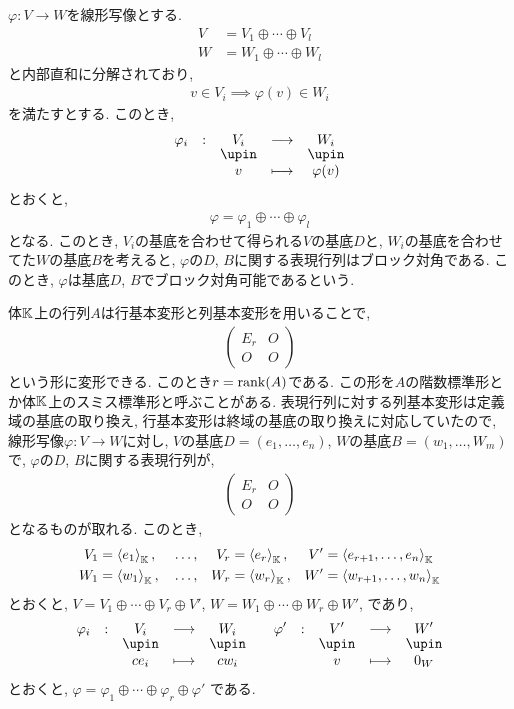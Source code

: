$\varphi\colon V\to W$を線形写像とする.
\begin{align*}
V&=V_1\oplus \cdots \oplus V_l\\
W&=W_1\oplus \cdots \oplus W_l
\end{align*}
と内部直和に分解されており,
\begin{align*}
v\in V_i\implies \varphi(v) \in W_i
\end{align*}
を満たすとする.
このとき,
\begin{align*}
\shazo{\varphi_i}{V_i}{W_i}
{v}{\varphi(v)}
\end{align*}
とおくと,
\begin{align*}
\varphi=\varphi_1\oplus\cdots\oplus \varphi_l
\end{align*}
となる.
このとき, $V_i$の基底を合わせて得られる$V$の基底$D$と,
$W_i$の基底を合わせてた$W$の基底$B$を考えると,
$\varphi$の$D$, $B$に関する表現行列はブロック対角である.
このとき, $\varphi$は基底$D$, $B$でブロック対角可能であるという.

体$\mathbb{K}$上の行列$A$は行基本変形と列基本変形を用いることで,
\begin{align*}
\begin{pmatrix}E_r&O\\O&O\end{pmatrix}
\end{align*}
という形に変形できる.
このとき$r=\operatorname{rank}(A)$である.
この形を$A$の階数標準形とか体$\mathbb{K}$上のスミス標準形と呼ぶことがある.
表現行列に対する列基本変形は定義域の基底の取り換え,
行基本変形は終域の基底の取り換えに対応していたので,
線形写像$\varphi\colon V\to W$に対し,
$V$の基底$D=(e_1,\ldots,e_n)$,
$W$の基底$B=(w_1,\ldots,W_m)$
で,
$\varphi$の$D$, $B$に関する表現行列が,
\begin{align*}
\begin{pmatrix}E_r&O\\O&O\end{pmatrix}
\end{align*}
となるものが取れる.
このとき,
\begin{align*}
V_1&=\Braket{e_1}_{\mathbb{K}},
&&\ldots,&V_r&=\Braket{e_r}_{\mathbb{K}},&
V'&=\Braket{e_{r+1},\ldots,e_{n}}_{\mathbb{K}}\\
W_1&=\Braket{w_1}_{\mathbb{K}},
&&\ldots,&W_r&=\Braket{w_r}_{\mathbb{K}},&
W'&=\Braket{w_{r+1},\ldots,w_{n}}_{\mathbb{K}}
\end{align*}
とおくと,
$V=V_1\oplus\cdots\oplus V_r\oplus V'$,
$W=W_1\oplus\cdots\oplus W_r\oplus W'$,
であり,
\begin{align*}
\shazo{\varphi_i}{V_i}{W_i}
{ce_i}{cw_i}
&&
\shazo{\varphi'}{V'}{W'}
{v}{0_W}
\end{align*}
とおくと,
$\varphi=\varphi_1\oplus\cdots\oplus\varphi_r\oplus \varphi'$
である.

